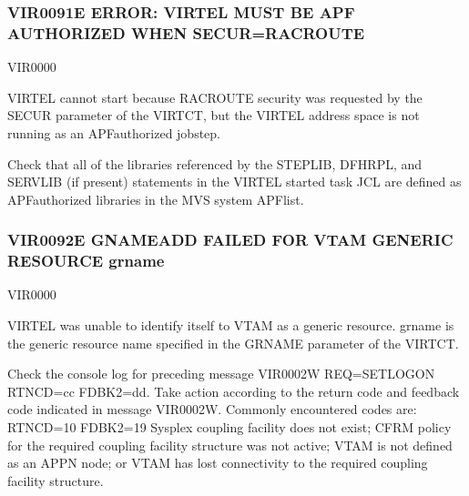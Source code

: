 \documentclass[letterpaper,10pt,english]{sphinxmanual}
\begin{document}
\subsubsection{VIR0091E ERROR: VIRTEL MUST BE APF AUTHORIZED WHEN SECUR=RACROUTE}
\label{\detokenize{messages:vir0091e-error-virtel-must-be-apf-authorized-when-secur-racroute}}\begin{description}
\sphinxAtStartPar
VIR0000

\sphinxAtStartPar
VIRTEL cannot start because RACROUTE security was requested by the SECUR parameter of the VIRTCT, but the VIRTEL address space is not running as an APF\sphinxhyphen{}authorized jobstep.

\sphinxAtStartPar
Check that all of the libraries referenced by the STEPLIB, DFHRPL, and SERVLIB (if present) statements in the VIRTEL started task JCL are defined as APF\sphinxhyphen{}authorized libraries in the MVS system APF\sphinxhyphen{}list.

\end{description}


\subsubsection{VIR0092E GNAMEADD FAILED FOR VTAM GENERIC RESOURCE grname}
\label{\detokenize{messages:vir0092e-gnameadd-failed-for-vtam-generic-resource-grname}}\begin{description}
\sphinxAtStartPar
VIR0000

\sphinxAtStartPar
VIRTEL was unable to identify itself to VTAM as a generic resource. grname is the generic resource name specified in the GRNAME parameter of the VIRTCT.

\sphinxAtStartPar
Check the console log for preceding message VIR0002W REQ=SETLOGON RTNCD=cc FDBK2=dd. Take action according to the return code and feedback code indicated in message VIR0002W. Commonly encountered codes are:
\sphinxhyphen{} RTNCD=10 FDBK2=19 Sysplex coupling facility does not exist; CFRM policy for the required coupling facility structure was not active; VTAM is not defined as an APPN node; or VTAM has lost connectivity to the required coupling facility structure.

\end{description}
\end{document}
